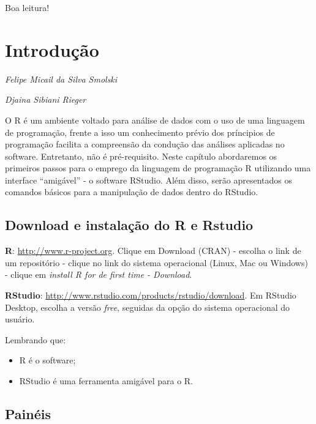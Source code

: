 \documentclass[12pt,brazil,]{book}
\providecommand{\tightlist}{%
  \setlength{\itemsep}{0pt}\setlength{\parskip}{0pt}}
\begin{document}
Boa leitura!

\hypertarget{introducao}{%
\chapter{Introdução}\label{introducao}}

\begin{flushright}
\emph{Felipe Micail da Silva Smolski}

\emph{Djaina Sibiani Rieger}
\end{flushright}

O R é um ambiente voltado para análise de dados com o uso de uma
linguagem de programação, frente a isso um conhecimento prévio dos
príncipios de programação facilita a compreensão da condução das
análises aplicadas no software. Entretanto, não é pré-requisito. Neste
capítulo abordaremos os primeiros passos para o emprego da linguagem de
programação R utilizando uma interface ``amigável'' - o software
RStudio. Além disso, serão apresentados os comandos básicos para a
manipulação de dados dentro do RStudio.

\hypertarget{download-e-instalacao-do-r-e-rstudio}{%
\section{Download e instalação do R e
Rstudio}\label{download-e-instalacao-do-r-e-rstudio}}

\textbf{R}: \url{http://www.r-project.org}. Clique em Download (CRAN) -
escolha o link de um repositório - clique no link do sistema operacional
(Linux, Mac ou Windows) - clique em \emph{install R for de first time -
Download}.

\textbf{RStudio}:
\url{http://www.rstudio.com/products/rstudio/download}. Em RStudio
Desktop, escolha a versão \emph{free}, seguidas da opção do sistema
operacional do usuário.

Lembrando que:

\begin{itemize}
\tightlist
\item
  R é o software;
\item
  RStudio é uma ferramenta amigável para o R.
\end{itemize}

\hypertarget{paineis}{%
\section{Painéis}\label{paineis}}
\end{document}
